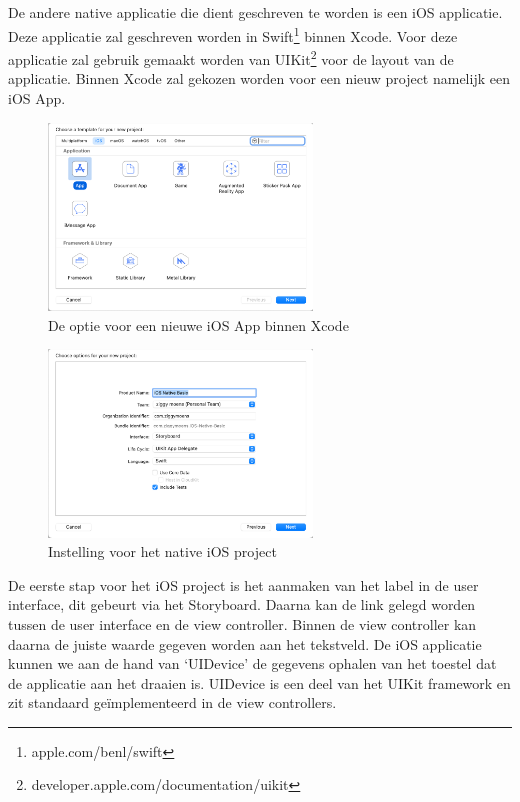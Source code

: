 \subsection{}
\label{sec:M-first-native-ios}
De andere native applicatie die dient geschreven te worden is een iOS applicatie. Deze applicatie zal geschreven worden in Swift\footnote{apple.com/benl/swift} binnen Xcode. Voor deze applicatie zal gebruik gemaakt worden van UIKit\footnote{developer.apple.com/documentation/uikit} voor de layout van de applicatie. Binnen Xcode zal gekozen worden voor een nieuw project namelijk een iOS App.

\begin{figure}
    \centering
    \includegraphics[width=7cm]{img/ios-basic-start.png}
    \caption{De optie voor een nieuwe iOS App binnen Xcode}
    \label{fig:M-basic-ios-start}
\end{figure}

\begin{figure}
    \centering
    \includegraphics[width=7cm]{img/ios-basic-settings.png}
    \caption{Instelling voor het native iOS project}
    \label{fig:M-basic-ios-settings}
\end{figure}

De eerste stap voor het iOS project is het aanmaken van het label in de user interface, dit gebeurt via het Storyboard. Daarna kan de link gelegd worden tussen de user interface en de view controller. Binnen de view controller kan daarna de juiste waarde gegeven worden aan het tekstveld. De iOS applicatie kunnen we aan de hand van `UIDevice' de gegevens ophalen van het toestel dat de applicatie aan het draaien is. UIDevice is een deel van het UIKit framework en zit standaard geïmplementeerd in de view controllers.

